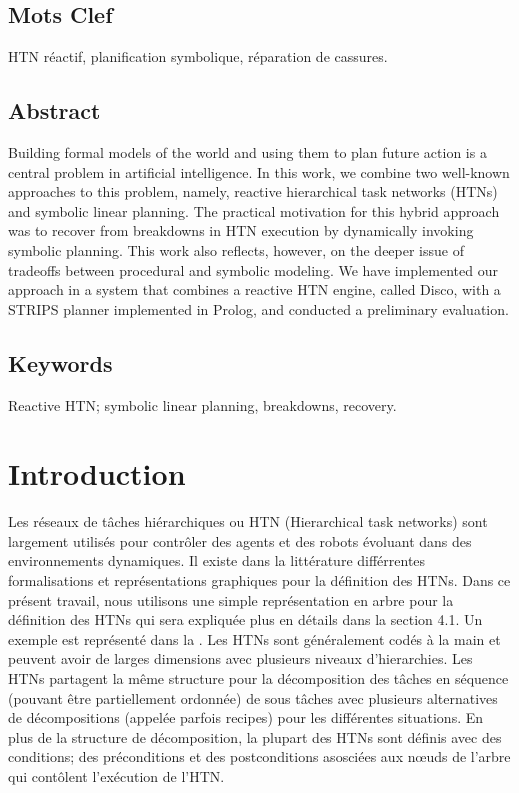 \documentclass[a4paper,twoside,french]{article}
\begin{document}
				\subsection*{Mots Clef}
				HTN réactif, planification symbolique, réparation de cassures.
				
				\subsection*{Abstract}
				Building formal models of the world and using them to plan future
				action is a central problem in artificial intelligence.  In this
				work, we combine two well-known approaches to this problem, namely,
				reactive hierarchical task networks (HTNs) and symbolic linear
				planning.  The practical motivation for this hybrid approach was to
				recover from breakdowns in HTN execution by dynamically invoking
				symbolic planning.  This work also reflects, however, on the deeper
				issue of tradeoffs between procedural and symbolic modeling.  We
				have implemented our approach in a system that combines a reactive
				HTN engine, called Disco, with a STRIPS planner implemented in
				Prolog, and conducted a preliminary evaluation.
				\subsection*{Keywords}
				Reactive HTN; symbolic linear planning, breakdowns, recovery.
				
				
				\section{Introduction}
				Les r\'eseaux de t\^aches hi\'erarchiques ou HTN \cite{erol1994htn} (Hierarchical task networks) sont largement utilis\'es pour contr\^oler des agents et des robots \'evoluant dans des environnements dynamiques. Il existe dans la litt\'erature diff\'errentes formalisations et  repr\'esentations graphiques pour la d\'efinition des HTNs. Dans ce pr\'esent travail, nous utilisons une simple repr\'esentation en arbre pour la  d\'efinition des HTNs qui sera expliqu\'ee plus en d\'etails dans la section 4.1. Un exemple est repr\'esent\'e dans la .
				Les HTNs sont g\'en\'eralement cod\'es \`a la main et peuvent avoir de larges dimensions avec plusieurs niveaux d'hierarchies.  Les HTNs partagent la m\^eme structure pour la d\'ecomposition des t\^aches en s\'equence (pouvant \^etre partiellement ordonn\'ee) de sous t\^aches avec plusieurs alternatives de d\'ecompositions (appel\'ee parfois recipes) pour les diff\'erentes situations. En plus de la structure de d\'ecomposition, la plupart des HTNs sont d\'efinis avec des conditions; des pr\'econditions et des postconditions asosci\'ees aux n\oe uds de l'arbre qui  cont\^olent l'ex\'ecution de l'HTN.
								
\end{document}
